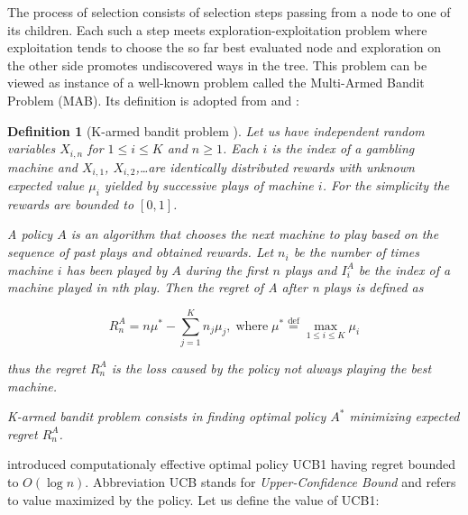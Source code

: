 The process of selection consists of selection steps passing from a node to one of its children.
Each such a step meets exploration-exploitation problem where exploitation tends to choose the
so far best evaluated node and exploration on the other side promotes
undiscovered ways in the tree. This problem can be viewed as instance of a well-known problem 
called the Multi-Armed Bandit Problem (MAB). Its definition is adopted from \cite{Auer2002} and 
\cite{Kocsis2006}:

\begin{samepage}
\newtheorem*{defmab}{Definition}
\begin{defmab}[K-armed bandit problem ] 

Let us have independent random variables $X_{i,n}$ for $1 \le i \le K$ and $n \ge 1$. Each $i$ is
the index of a gambling machine and $X_{i,1}$, $X_{i,2}$,\ldots are identically distributed rewards
with unknown expected value $\mu_i$ yielded by successive plays of machine $i$. For the simplicity
the rewards are bounded to $[0,1]$.

A policy $A$ is an algorithm that chooses the next machine to play based on the sequence of
past plays and obtained rewards. Let $n_i$ be the number of times machine $i$ has been played by
$A$ during the first $n$ plays and $I_i^A$ be the index of a machine played in nth play. Then the
regret of A after n plays is defined as

\begin{equation}
R_n^A = n \mu^* - \sum_{j=1}^K n_j \mu_j \mathrm{,\;where}\;\mu^* \stackrel{\mathrm{def}}{=}
\max_{1 \le i \le K} \mu_i
\end{equation}

thus the regret $R_n^A$ is the loss caused by the policy not always playing the best machine.

K-armed bandit problem consists in finding optimal policy $A^*$ minimizing
expected regret $R_n^A$.

\end{defmab}
\end{samepage}


 introduced computationaly effective optimal policy UCB1 \cite{Auer2002} 
having regret bounded to $O(\log{n})$. Abbreviation UCB stands for \emph{Upper-Confidence Bound}
and refers to value maximized by the policy. Let us define the value of UCB1:

